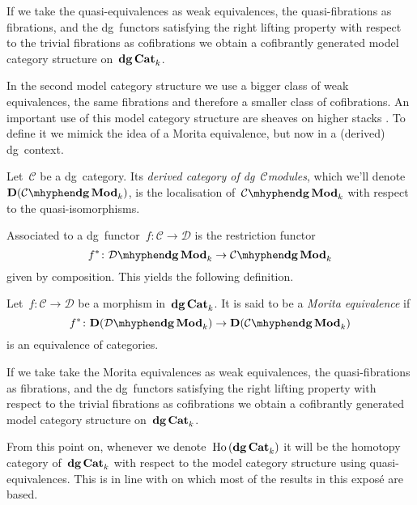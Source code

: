 \begin{theorem}
  \label{theorem:quasi-equivalences-model-category-structure}
  If we take the quasi-equivalences as weak equivalences, the quasi-fibrations as fibrations, and the dg~functors satisfying the right lifting property with respect to the trivial fibrations as cofibrations we obtain a cofibrantly generated model category structure on~$\mathbf{dg\,Cat}_k$.
\end{theorem}

In the second model category structure we use a bigger class of weak equivalences, the same fibrations and therefore a smaller class of cofibrations. An important use of this model category structure are sheaves on higher stacks \cite{chern}. To define it we mimick the idea of a Morita equivalence, but now in a (derived) dg~context.
\begin{definition}
  Let~$\mathcal{C}$ be a dg~category. Its \emph{derived category of dg~$\mathcal{C}$\dash modules}, which we'll denote~$\mathbf{D}(\dgMod{\mathcal{C}}_k)$, is the localisation of~$\dgMod{\mathcal{C}}_k$ with respect to the quasi-isomorphisms.
\end{definition}
Associated to a dg~functor~$f\colon\mathcal{C}\to\mathcal{D}$ is the restriction functor
\begin{equation}
  f^*\colon\dgMod{\mathcal{D}}_k\to\dgMod{\mathcal{C}}_k
\end{equation}
given by composition. This yields the following definition.
\begin{definition}
  Let~$f\colon\mathcal{C}\to\mathcal{D}$ be a morphism in~$\mathbf{dg\,Cat}_k$. It is said to be a \emph{Morita equivalence} if
  \begin{equation}
    f^*\colon\mathbf{D}(\dgMod{\mathcal{D}}_k)\to\mathbf{D}(\dgMod{\mathcal{C}}_k)
  \end{equation}
  is an equivalence of categories.
\end{definition}

\begin{theorem}
  \label{theorem:morita-morphisms-model-category-structure}
  If we take take the Morita equivalences as weak equivalences, the quasi-fibrations as fibrations, and the dg~functors satisfying the right lifting property with respect to the trivial fibrations as cofibrations we obtain a cofibrantly generated model category structure on~$\mathbf{dg\,Cat}_k$.
\end{theorem}

\begin{remark}
  From this point on, whenever we denote~$\mathrm{Ho} \,(\mathbf{dg\,Cat}_k)$ it will be the homotopy category of~$\mathbf{dg\,Cat}_k$ with respect to the model category structure using quasi-equivalences. This is in line with \cite{toen} on which most of the results in this expos\'e are based.
\end{remark}


